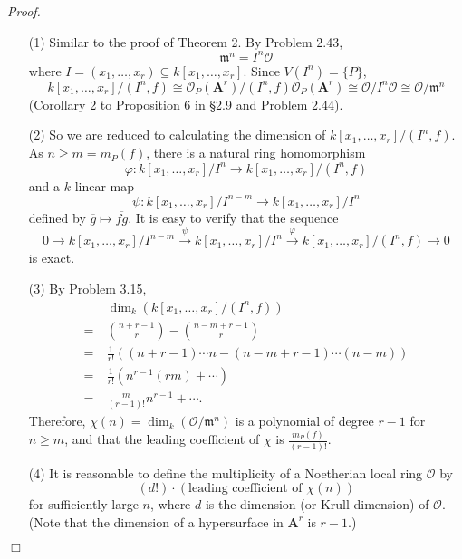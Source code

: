 \documentclass{article}
\begin{document}
\emph{Proof.}
\begin{enumerate}
\item[(1)]
  Similar to the proof of Theorem 2.
  By Problem 2.43,
  \[
    \mathfrak{m}^n = I^n \mathscr{O}
  \]
  where $I = (x_1, \ldots, x_r) \subseteq k[x_1,\ldots,x_r]$.
  Since $V(I^n) = \{P\}$,
  \[
    k[x_1,\ldots,x_r]/(I^n,f)
    \cong
    \mathscr{O}_P(\mathbf{A}^r)/(I^n,f)\mathscr{O}_P(\mathbf{A}^r)
    \cong
    \mathscr{O}/I^n \mathscr{O}
    \cong
    \mathscr{O}/\mathfrak{m}^n
  \]
  (Corollary 2 to Proposition 6 in \S 2.9 and Problem 2.44).

\item[(2)]
  So we are reduced to calculating the dimension of $k[x_1,\ldots,x_r]/(I^n,f)$.
  As $n \geq m = m_P(f)$,
  there is a natural ring homomorphism
  \[
    \varphi: k[x_1,\ldots,x_r]/I^n \to k[x_1,\ldots,x_r]/(I^n,f)
  \]
  and a $k$-linear map
  \[
    \psi: k[x_1,\ldots,x_r]/I^{n-m} \to k[x_1,\ldots,x_r]/I^n
  \]
  defined by $\overline{g} \mapsto \overline{fg}$.
  It is easy to verify that the sequence
  \[
    0
    \to k[x_1,\ldots,x_r]/I^{n-m}
    \xrightarrow{\psi} k[x_1,\ldots,x_r]/I^{n}
    \xrightarrow{\varphi} k[x_1,\ldots,x_r]/(I^{n},f)
    \to 0
  \]
  is exact.

\item[(3)]
  By Problem 3.15,
  \begin{align*}
    & \: \dim_k(k[x_1,\ldots,x_r]/(I^{n},f)) \\
    =& \:
    {n+r-1 \choose r} - {n-m+r-1 \choose r} \\
    =& \:
    \frac{1}{r!} \left( (n+r-1) \cdots n - (n-m+r-1) \cdots (n-m) \right) \\
    =& \:
    \frac{1}{r!} \left( n^{r-1}(rm) + \cdots \right) \\
    =& \:
    \frac{m}{(r-1)!} n^{r-1} + \cdots.
  \end{align*}
  Therefore, $\chi(n) = \dim_k(\mathscr{O}/\mathfrak{m}^n)$ is a polynomial of degree $r-1$
  for $n \geq m$,
  and that the leading coefficient of $\chi$ is $\frac{m_P(f)}{(r-1)!}$.

\item[(4)]
  It is reasonable to define the multiplicity of a Noetherian local ring $\mathscr{O}$ by
  \[
    (d!) \cdot (\text{leading coefficient of } \chi(n))
  \]
  for sufficiently large $n$,
  where $d$ is the dimension (or Krull dimension) of $\mathscr{O}$.
  (Note that the dimension of a hypersurface in $\mathbf{A}^r$ is $r-1$.)
\end{enumerate}
$\Box$ \\\\
\end{document}
